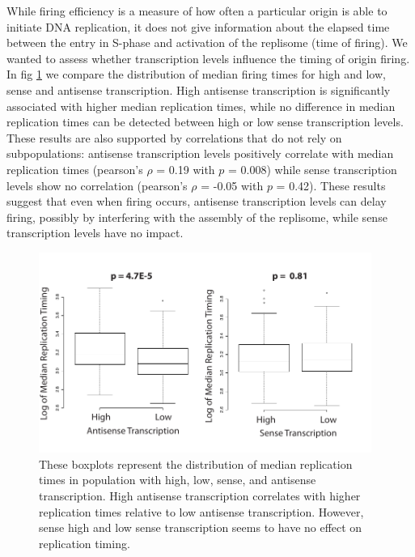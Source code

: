While firing efficiency is a measure of how often a particular origin is able to initiate DNA replication, it does not give information about the elapsed time between the entry in S-phase and activation of the replisome (time of firing). We wanted to assess whether transcription levels influence the timing of origin firing. In fig \ref{fig:timing} we compare the distribution of median firing times for high and low, sense and antisense transcription. High antisense transcription is significantly associated with higher median replication times, while no difference in median replication times can be detected between high or low sense transcription levels. These results are also supported by correlations that do not rely on subpopulations: antisense transcription levels positively correlate with median replication times (pearson’s $\rho$ = 0.19 with $p$ = 0.008) while sense transcription levels show no correlation (pearson’s $\rho$ = -0.05 with $p$ = 0.42). These results suggest that even when firing occurs, antisense transcription levels can delay firing, possibly by interfering with the assembly of the replisome, while sense transcription levels have no impact.
\begin{figure}[h!]

\centering
\includegraphics[width=0.97\textwidth]{figures/results/timing}
\caption[boxplots comparing median replication times in high- and low-transcription populations]{These boxplots represent the distribution of median replication times in population with high, low, sense, and antisense transcription. High antisense transcription correlates with higher replication times relative to low antisense transcription. However, sense high and low sense transcription seems to have no effect on replication timing.}
\label{fig:timing}

\end{figure} 



